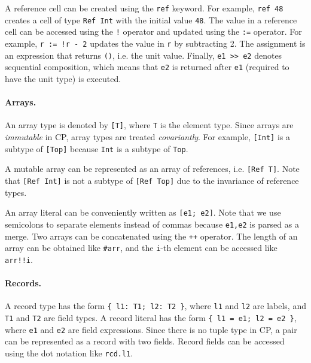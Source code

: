 A reference cell can be created using the \lstinline{ref} keyword. For example,
\lstinline{ref 48} creates a cell of type \lstinline{Ref Int} with the initial
value \lstinline{48}. The value in a reference cell can be accessed using the
\lstinline{!} operator and updated using the \lstinline{:=} operator. For
example, \lstinline{r := !r - 2} updates the value in \lstinline{r} by
subtracting 2. The assignment is an expression that returns \lstinline{()}, i.e.
the unit value. Finally, \lstinline{e1 >> e2} denotes sequential composition,
which means that \lstinline{e2} is returned after \lstinline{e1} (required to
have the unit type) is executed.

\paragraph{Arrays.}
An array type is denoted by \lstinline{[T]}, where \lstinline{T} is the element
type. Since arrays are \emph{immutable} in CP, array types are treated
\emph{covariantly}. For example, \lstinline{[Int]} is a subtype of
\lstinline{[Top]} because \lstinline{Int} is a subtype of \lstinline{Top}.

\begin{tipblock}
A mutable array can be represented as an array of references, i.e.
\lstinline{[Ref T]}. Note that \lstinline{[Ref Int]} is not a subtype of
\lstinline{[Ref Top]} due to the invariance of reference types.
\end{tipblock}

\noindent
An array literal can be conveniently written as \lstinline{[e1; e2]}. Note that
we use semicolons to separate elements instead of commas because
\lstinline{e1,e2} is parsed as a merge. Two arrays can be concatenated using the
\lstinline{++} operator. The length of an array can be obtained like
\lstinline{#arr}, and the \lstinline{i}-th element can be accessed like
\lstinline{arr!!i}.

\paragraph{Records.}
A record type has the form \lstinline|{ l1: T1; l2: T2 }|, where \lstinline{l1}
and \lstinline{l2} are labels, and \lstinline{T1} and \lstinline{T2} are field
types. A record literal has the form \lstinline|{ l1 = e1; l2 = e2 }|, where
\lstinline{e1} and \lstinline{e2} are field expressions. Since there is no tuple
type in CP, a pair can be represented as a record with two fields. Record fields
can be accessed using the dot notation like \lstinline{rcd.l1}.

